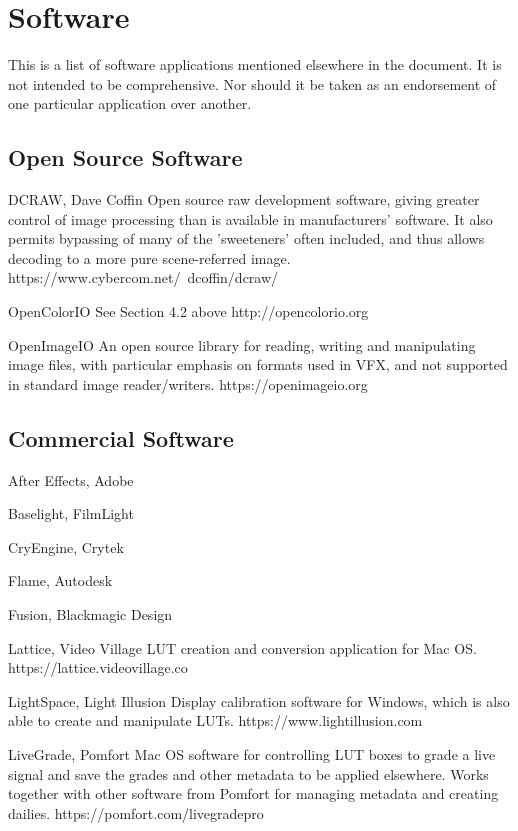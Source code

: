\section{Software}%
\label{sec:software}

This is a list of software applications mentioned elsewhere in the document. It is not intended to be comprehensive. Nor should it be taken as an endorsement of one particular application over another.

\subsection{Open Source Software}%
\label{subsec:open-source-software}

DCRAW, Dave Coffin
Open source raw development software, giving greater control of image processing than is available in manufacturers' software. It also permits bypassing of many of the 'sweeteners' often included, and thus allows decoding to a more pure scene-referred image. https://www.cybercom.net/~dcoffin/dcraw/

OpenColorIO
See Section 4.2 above
http://opencolorio.org

OpenImageIO
An open source library for reading, writing and manipulating image files, with particular emphasis on formats used in VFX, and not supported in standard image reader/writers. https://openimageio.org

\subsection{Commercial Software}%
\label{subsec:commercial-software}
After Effects, Adobe

Baselight, FilmLight

CryEngine, Crytek

Flame, Autodesk

Fusion, Blackmagic Design

Lattice, Video Village
LUT creation and conversion application for Mac OS. https://lattice.videovillage.co

LightSpace, Light Illusion
Display calibration software for Windows, which is also able to create and manipulate LUTs. https://www.lightillusion.com

LiveGrade, Pomfort
Mac OS software for controlling LUT boxes to grade a live signal and save the grades and other metadata to be applied elsewhere. Works together with other software from Pomfort for managing metadata and creating dailies. https://pomfort.com/livegradepro


